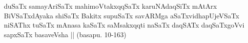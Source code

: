 \begin{entry}
\smallskip
\begin{shl}
duSaTx samayAriSaTx mahimoVtakxqqSaTx karuNAdaqSiTx mAtArx BiVSaTxdAyaka shiSaTx Bakitx supuSaTx savARMga aSaTxvidhapUjeVSaTx niSAThx tuSaTx mAnasa kaSaTx saMsakxqqti naSaTx daqSATx daqSaTxgoVvi sapxSaTx basaveVsha || (basapu. 10-163)
\end{shl}
\medskip
{}
\end{entry}



